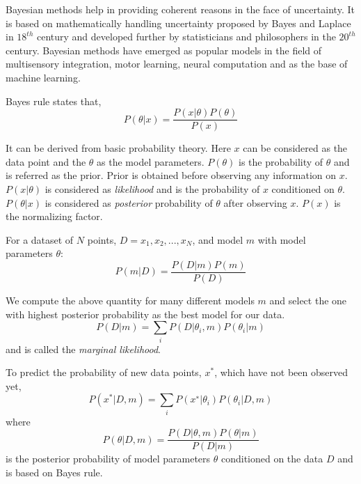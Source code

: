 % 
% 
% 

Bayesian methods help in providing coherent reasons in the face of uncertainty. It is based 
on mathematically handling uncertainty proposed by Bayes and Laplace in $18^{th}$ century and 
developed further by statisticians and philosophers in the $20^{th}$ century. Bayesian methods
have emerged as popular models in the field of multisensory integration, motor learning, 
neural computation and as the base of machine learning. 

Bayes rule states that,
\begin{equation}
P(\theta | x) = \frac{P(x|\theta) P(\theta)}{P(x)}
\end{equation}

It can be derived from basic probability theory. Here $x$ can be considered as the data point 
and the $\theta$ as the model parameters. $P(\theta)$ is the probability of $\theta$ and is 
referred as the prior. Prior is obtained before observing any information on $x$. $P(x|\theta)$ is
considered as \textit{likelihood} and is the probability of $x$ conditioned on $\theta$. $P(\theta|x)$
is considered as \textit{posterior} probability of $\theta$ after observing $x$. $P(x)$ is the
normalizing factor.

For a dataset of $N$ points, $D = {x_1, x_2, . . . , x_N}$, and model $m$ with model parameters 
$\theta$:
\begin{equation}
    P(m|D) = \frac{P(D|m) P(m)}{P(D)}
\end{equation}

We compute the above quantity for many different models $m$ and select the one with highest 
posterior probability as the best model for our data. 
\begin{equation}
    P(D|m) = \sum_i{P(D|\theta_i, m)P(\theta_i|m)}
\end{equation}
and is called the \textit{marginal likelihood}.

To predict the probability of new data points, $x^*$, which have not been observed yet,
\begin{equation}
    P(x^*|D, m) = \sum_i{ P(x^∗|\theta_i)P(\theta_i|D, m)}
\end{equation}
where
\begin{equation}
    P(\theta|D,m) = \frac{P(D|\theta, m)P(\theta|m)}{P(D|m)}
\end{equation}
is the posterior probability of model parameters $\theta$ conditioned on the data $D$ and is
based on Bayes rule.
